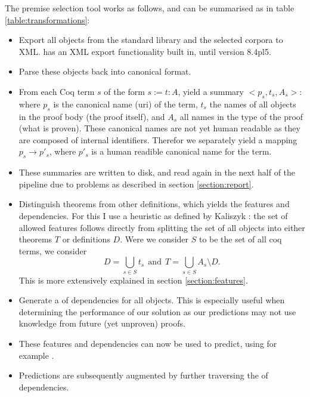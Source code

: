 The premise selection tool works as follows, and can be summarised as in table \ref{table:transformations}:
\begin{itemize}
    \item Export all \coq objects from the standard library and the selected corpora to XML.
		\coq has an XML export functionality built in, until version 8.4pl5.
	\item Parse these objects back into canonical \acic format.
	\item From each Coq term $s$ of the form $s := t : A$, yield a summary $<p_s, t_s, A_s>$:
		where $p_s$ is the canonical name (uri) of the term,
		$t_s$ the names of all objects in the proof body (the proof itself),
		and $A_s$ all names in the type of the proof (what is proven).
		These canonical names are not yet human readable as they are composed of internal identifiers.
		Therefor we separately yield a mapping $p_s \rightarrow p'_s$, where $p'_s$ is a human readible canonical name for the term.
	\item These summaries are written to disk, and read again in the next half of the pipeline due to problems as described in section \ref{section:report}.
	\item Distinguish theorems from other definitions, which yields the features and dependencies.
		For this I use a heuristic as defined by Kaliszyk \cite{kaliszyk2014machine}:
		the set of allowed features follows directly from splitting the set of all objects into either theorems $T$ or definitions $D$.
		Were we consider $S$ to be the set of all coq terms, we consider
		$$D = \bigcup_{s \in S} t_s ~~\text{and}~~ T = \bigcup_{s \in S} A_s \setminus D \text{.}$$
		This is more extensively explained in section \ref{section:features}.
    \item Generate a \dagraph of dependencies for all \coq objects.
		This is especially useful when determining the performance of our solution as our predictions may not use
		knowledge from future (yet unproven) proofs.
	\item These features and dependencies can now be used to predict, using for example \knn.
	\item Predictions are subsequently augmented by further traversing the \dagraph of dependencies.
\end{itemize}

